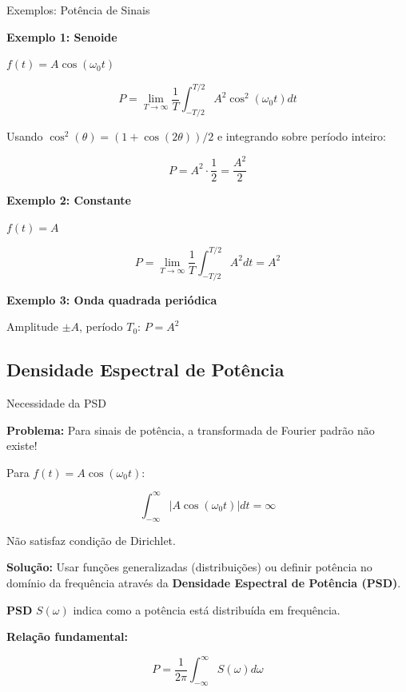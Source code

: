 \begin{frame}{Exemplos: Potência de Sinais}

\textbf{Exemplo 1: Senoide}

$f(t) = A\cos(\omega_0 t)$

\[
P = \lim_{T \to \infty} \frac{1}{T} \int_{-T/2}^{T/2} A^2\cos^2(\omega_0 t) dt
\]

Usando $\cos^2(\theta) = (1 + \cos(2\theta))/2$ e integrando sobre período inteiro:

\[
P = A^2 \cdot \frac{1}{2} = \frac{A^2}{2}
\]

\vspace{0.1cm}

\textbf{Exemplo 2: Constante}

$f(t) = A$

\[
P = \lim_{T \to \infty} \frac{1}{T} \int_{-T/2}^{T/2} A^2 dt = A^2
\]

\vspace{0.1cm}

\textbf{Exemplo 3: Onda quadrada periódica}

Amplitude $\pm A$, período $T_0$: $P = A^2$

\end{frame}


\subsection{Densidade Espectral de Potência}

\begin{frame}{Necessidade da PSD}

\textbf{Problema:} Para sinais de potência, a transformada de Fourier padrão não existe!

Para $f(t) = A\cos(\omega_0 t)$:

\[
\int_{-\infty}^{\infty} |A\cos(\omega_0 t)| dt = \infty
\]

Não satisfaz condição de Dirichlet.

\vspace{0.1cm}

\textbf{Solução:} Usar funções generalizadas (distribuições) ou definir potência no domínio da frequência através da \textbf{Densidade Espectral de Potência (PSD)}.

\textbf{PSD} $S(\omega)$ indica como a potência está distribuída em frequência.

\vspace{0.1cm}

\textbf{Relação fundamental:}

\[
P = \frac{1}{2\pi} \int_{-\infty}^{\infty} S(\omega) d\omega
\]

\end{frame}

